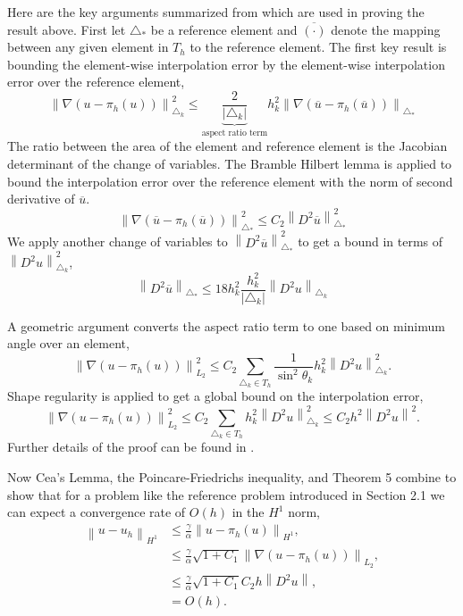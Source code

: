 \documentclass[12 pt]{report}
\newcommand{\norm}[2]{\left \lVert #1 \right \rVert_{#2}}
\newcommand{\abs}[1]{\left| #1 \right|}
\begin{document}
Here are the key arguments summarized from \citep{elman_finite_2005} which are used in proving the result above. First let $\triangle_*$ be a reference element and $\overline{(\cdot)}$ denote the mapping between any given element in $T_h$ to the reference element. The first key result is bounding the element-wise interpolation error by the element-wise interpolation error over the reference element, 
\begin{equation}
  \norm{\nabla(u - \pi_h(u))}{\triangle_k}^2 \leq \underbrace{\frac{2}{\abs{\triangle_k}}}_{\text{aspect ratio term}}h_k^2\norm{\nabla(\overline{u} - \pi_h(\overline{u}))}{\triangle_*}
\end{equation}
The ratio between the area of the element and reference element is the Jacobian determinant of the  change of variables. The Bramble Hilbert lemma \citep{elman_finite_2005} is applied to bound the interpolation error over the reference element with the norm of second derivative of $\overline{u}$. 
\begin{equation}
  \norm{\nabla(\overline{u} - \pi_h(\overline{u}))}{\triangle_*}^2 \leq C_2 \norm{D^2\overline{u}}{\triangle_*}^2
\end{equation}
We apply another change of variables to $\norm{D^2\overline{u}}{\triangle_*}^2$ to get a bound in terms of $\norm{D^2u}{\triangle_k}^2$,
\begin{equation}
  \norm{D^2\overline{u}}{\triangle_*} \leq 18h_k^2 \frac{h_k^2}{\abs{\triangle_k}}\norm{D^2u}{\triangle_k}
\end{equation}

A geometric argument converts the aspect ratio term to one based on minimum angle over an element,
\begin{equation}
  \norm{\nabla(u - \pi_h(u))}{L_2}^2 \leq C_2\sum_{{\triangle_k}\in {T_h}} \frac{1}{\sin^2 \theta_k} h_k^2 \norm{D^2u}{\triangle_k}^2.
 \end{equation}
Shape regularity is applied to get a global bound on the interpolation error, 
\begin{equation}
  \norm{\nabla(u - \pi_h(u))}{L_2}^2 \leq C_2\sum_{{\triangle_k}\in {T_h}} h_k^2 \norm{D^2u}{\triangle_k}^2 \leq C_2h^2 \norm{D^2u}{}^2.
\end{equation}
Further details of the proof can be found in \citet{elman_finite_2005}. 

Now Cea's Lemma,  the Poincare-Friedrichs inequality, and Theorem 5 combine to show that for a problem like the reference problem introduced in Section 2.1 we can expect a convergence rate of $O(h)$ in the $H^1$ norm,
\begin{align*}
  \norm{u - u_h}{H^1} &\leq \frac{\gamma}{\alpha}\norm{u - \pi_h(u)}{H^1},\\
  &\leq \frac{\gamma}{\alpha} \sqrt{1 + C_1} \norm{\nabla(u - \pi_h(u))}{L_2},\\
  &\leq \frac{\gamma}{\alpha} \sqrt{1 + C_1} C_2 h \norm{D^2u}{},\\
  &= O(h).
\end{align*}
\end{document}
